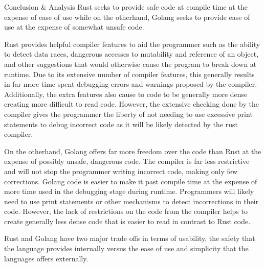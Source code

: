 Conclusion & Analysis
Rust seeks to provide safe code at compile time at the expense of ease of use while on the otherhand, Golang seeks to provide ease of use at the expense of somewhat unsafe code. 

Rust provides helpful compiler features to aid the programmer such as the ability to detect data races, dangerous accesses to mutability and reference of an object, and other suggestions that would otherwise cause the program to break down at runtime. Due to its extensive number of compiler features, this generally results in far more time spent debugging errors and warnings proposed by the compiler. Additionally, the extra features also cause to code to be generally more dense creating more difficult to read code. However, the extensive checking done by the compiler gives the programmer the liberty of not needing to use excessive print statements to debug incorrect code as it will be likely detected by the rust compiler.

On the otherhand, Golang offers far more freedom over the code than Rust at the expense of possibly unsafe, dangerous code. The compiler is far less restrictive and will not stop the programmer writing incorrect code, making only few corrections. Golang code is easier to make it past compile time at the expense of more time used in the debugging stage during runtime. Programmers will likely need to use print statements or other mechanisms to detect incorrections in their code. However, the lack of restrictions on the code from the compiler helps to create generally less dense code that is easier to read in contrast to Rust code.

Rust and Golang have two major trade offs in terms of usability, the safety that the language provides internally versus the ease of use and simplicity that the languages offers externally.

